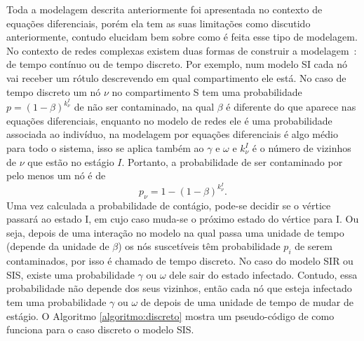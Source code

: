 Toda a modelagem descrita anteriormente foi apresentada no contexto de equações diferenciais, porém ela tem as suas limitações como discutido anteriormente, contudo elucidam bem sobre como é feita esse tipo de modelagem. No contexto de redes complexas existem duas formas de construir a 
modelagem~\cite{networks}: 
de tempo contínuo ou de tempo discreto. 
Por exemplo, num modelo SI 
cada nó vai receber um rótulo descrevendo em qual compartimento ele está. No caso de tempo discreto um nó
$\nu$ 
no compartimento S tem uma
probabilidade $p = (1 - \beta)^{k^I_\nu}$ de não ser contaminado, na qual $\beta$ é diferente do que aparece nas equações diferenciais, enquanto no modelo de redes ele é uma probabilidade associada ao indivíduo, na modelagem por equações diferenciais é algo médio para todo o sistema, isso se aplica também ao $\gamma$ e $\omega$ e $k_\nu^I$ é o número de vizinhos de $\nu$ que estão no estágio $I$. Portanto, a probabilidade de ser contaminado por pelo menos um nó é de
\begin{equation}
    p_\nu = 1 - (1 - \beta)^{k^I_\nu}.
\end{equation}
Uma vez calculada a probabilidade de contágio, pode-se decidir se o vértice passará ao estado I, em cujo caso muda-se o próximo estado do vértice para I. Ou seja, depois de uma interação no modelo na qual passa uma unidade de tempo (depende da unidade de $\beta$) os nós suscetíveis 
têm 
probabilidade $p_i$ de serem contaminados, por isso é chamado de tempo discreto. No caso do modelo SIR ou SIS, existe uma probabilidade $\gamma$ ou $\omega$ dele sair do estado infectado. Contudo, essa probabilidade não depende dos seus vizinhos, então cada nó que esteja infectado tem uma probabilidade $\gamma$ ou $\omega$ de depois de uma unidade de tempo de mudar de estágio. O Algoritmo \ref{algoritmo:discreto} mostra um pseudo-código de como funciona para o caso discreto o modelo SIS.

